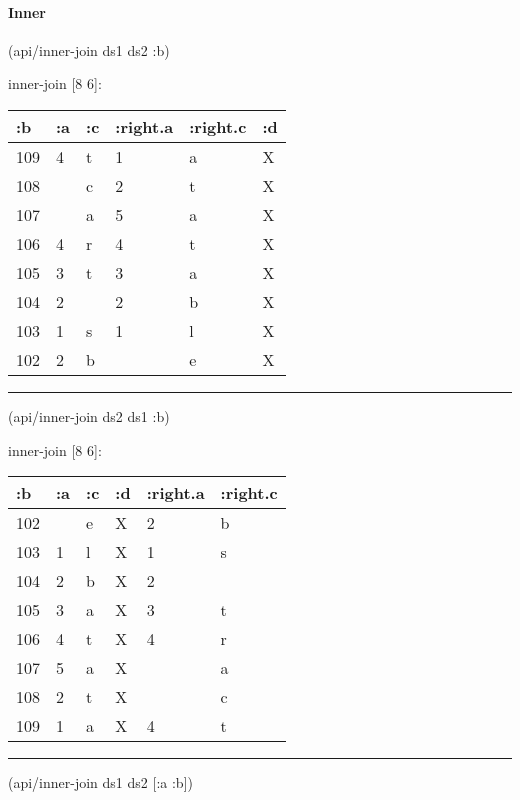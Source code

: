 \documentclass[]{article}
\newenvironment{Shaded}{\begin{snugshade}}{\end{snugshade}}
\newcommand{\AttributeTok}[1]{\textcolor[rgb]{0.77,0.63,0.00}{#1}}
\newcommand{\NormalTok}[1]{#1}
\let\oldparagraph\paragraph
\renewcommand{\paragraph}[1]{\oldparagraph{#1}\mbox{}}
\begin{document}
\hypertarget{inner}{%
\paragraph{Inner}\label{inner}}

\begin{Shaded}
\begin{Highlighting}[]
\NormalTok{(api/inner-join ds1 ds2 }\AttributeTok{:b}\NormalTok{)}
\end{Highlighting}
\end{Shaded}

inner-join {[}8 6{]}:

\begin{longtable}[]{@{}llllll@{}}
\toprule
:b & :a & :c & :right.a & :right.c & :d\tabularnewline
\midrule
\endhead
109 & 4 & t & 1 & a & X\tabularnewline
108 & & c & 2 & t & X\tabularnewline
107 & & a & 5 & a & X\tabularnewline
106 & 4 & r & 4 & t & X\tabularnewline
105 & 3 & t & 3 & a & X\tabularnewline
104 & 2 & & 2 & b & X\tabularnewline
103 & 1 & s & 1 & l & X\tabularnewline
102 & 2 & b & & e & X\tabularnewline
\bottomrule
\end{longtable}

\begin{center}\rule{0.5\linewidth}{0.5pt}\end{center}

\begin{Shaded}
\begin{Highlighting}[]
\NormalTok{(api/inner-join ds2 ds1 }\AttributeTok{:b}\NormalTok{)}
\end{Highlighting}
\end{Shaded}

inner-join {[}8 6{]}:

\begin{longtable}[]{@{}llllll@{}}
\toprule
:b & :a & :c & :d & :right.a & :right.c\tabularnewline
\midrule
\endhead
102 & & e & X & 2 & b\tabularnewline
103 & 1 & l & X & 1 & s\tabularnewline
104 & 2 & b & X & 2 &\tabularnewline
105 & 3 & a & X & 3 & t\tabularnewline
106 & 4 & t & X & 4 & r\tabularnewline
107 & 5 & a & X & & a\tabularnewline
108 & 2 & t & X & & c\tabularnewline
109 & 1 & a & X & 4 & t\tabularnewline
\bottomrule
\end{longtable}

\begin{center}\rule{0.5\linewidth}{0.5pt}\end{center}

\begin{Shaded}
\begin{Highlighting}[]
\NormalTok{(api/inner-join ds1 ds2 [}\AttributeTok{:a} \AttributeTok{:b}\NormalTok{])}
\end{Highlighting}
\end{Shaded}
\end{document}

